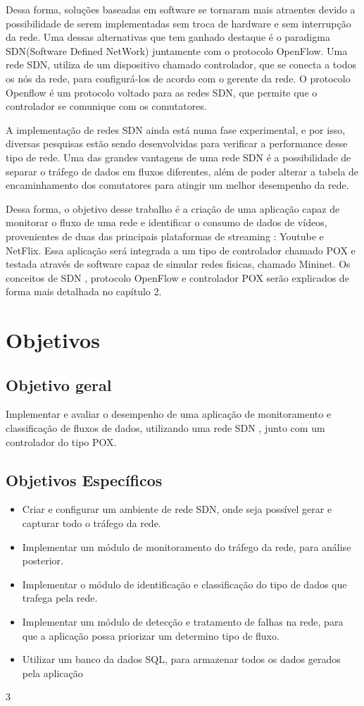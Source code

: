 Dessa forma, soluções baseadas em software se tornaram mais atraentes devido a possibilidade de serem implementadas sem troca de hardware e sem interrupção da rede. Uma dessas alternativas que tem ganhado destaque é o paradigma SDN(Software Defined NetWork) juntamente com o protocolo OpenFlow. Uma rede SDN, utiliza de um dispositivo chamado controlador, que se conecta a todos os nós da rede, para configurá-los de acordo com o gerente da rede. O protocolo Openflow é um protocolo voltado para as redes SDN, que permite que o controlador se comunique com os comutatores.

A implementação de redes SDN ainda está numa fase experimental, e por isso, diversas pesquisas estão sendo desenvolvidas para verificar a performance desse tipo de rede. Uma das grandes vantagens de uma rede SDN é a possibilidade de separar o tráfego de dados em fluxos diferentes, além de poder alterar a tabela de encaminhamento dos comutatores para atingir um melhor desempenho da rede. 

Dessa forma, o objetivo desse trabalho é a criação de uma aplicação capaz de monitorar o fluxo de uma rede e identificar o consumo de dados de vídeos, provenientes de duas das principais plataformas de streaming : Youtube e NetFlix. Essa aplicação será integrada a um tipo de controlador chamado POX e testada através de software capaz de simular redes fisicas, chamado Mininet. Os conceitos de SDN , protocolo OpenFlow e controlador POX serão explicados de forma mais detalhada no capítulo 2.

\section{Objetivos}
\subsection{Objetivo geral}
Implementar e avaliar o desempenho de uma aplicação de monitoramento e classificação de fluxos de dados, utilizando uma rede SDN , junto com um controlador do tipo POX.

\subsection{Objetivos Específicos}

\begin{itemize}
\item Criar e configurar um ambiente de rede SDN, onde seja possível gerar e capturar todo o tráfego da rede. 
\item Implementar um módulo de monitoramento do tráfego da rede, para análise posterior.
\item Implementar o módulo de identificação e classificação do tipo de dados que trafega pela rede.
\item Implementar um módulo de detecção e tratamento de falhas na rede, para que a aplicação possa priorizar um determino tipo de fluxo.
\item Utilizar um banco da dados SQL, para armazenar todos os dados gerados pela aplicação
\end{itemize}3

